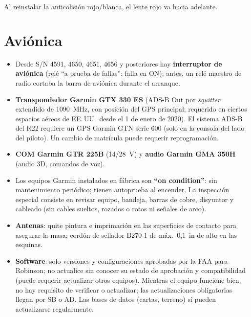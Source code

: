 Al reinstalar la anticolisión rojo/blanca, el lente rojo va hacia adelante.

\section{Aviónica}

\begin{itemize}
\item Desde S/N 4591, 4650, 4651, 4656 y posteriores hay \textbf{interruptor de aviónica} (relé ``a prueba de fallas'': falla en ON); antes, un relé maestro de radio cortaba la barra de aviónica durante el arranque.
\item \textbf{Transpondedor Garmin GTX 330 ES} (ADS-B Out por \emph{squitter} extendido de 1090~MHz, con posición del GPS principal; requerido en ciertos espacios aéreos de EE.\,UU.\ desde el 1 de enero de 2020). El sistema ADS-B del R22 requiere un GPS Garmin GTN serie 600 (solo en la consola del lado del piloto). Un cambio de matrícula puede requerir reprogramación.
\item \textbf{COM Garmin GTR 225B} (14/28~V) y \textbf{audio Garmin GMA 350H} (audio 3D, comandos de voz).
\item Los equipos Garmin instalados en fábrica son \textbf{``on condition''}: sin mantenimiento periódico; tienen autoprueba al encender. La inspección especial consiste en revisar equipo, bandeja, barras de cobre, disyuntor y cableado (sin cables sueltos, rozados o rotos ni señales de arco).
\item \textbf{Antenas}: quite pintura e imprimación en las superficies de contacto para asegurar la masa; cordón de sellador B270-1 de máx.\ 0,1~in de alto en las esquinas.
\item \textbf{Software}: solo versiones y configuraciones aprobadas por la FAA para Robinson; no actualice sin conocer su estado de aprobación y compatibilidad (puede requerir actualizar otros equipos). Mientras el equipo funcione bien, no hay requisito de verificar o actualizar; las actualizaciones obligatorias llegan por SB o AD. Las bases de datos (cartas, terreno) sí pueden actualizarse regularmente.
\end{itemize}
